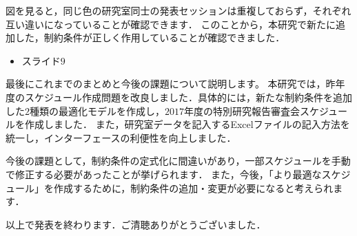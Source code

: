 \documentclass[a4j]{jarticle}
\begin{document}
図を見ると，同じ色の研究室同士の発表セッションは重複しておらず，それぞれ互い違いになっていることが確認できます．
このことから，本研究で新たに追加した，制約条件が正しく作用していることが確認できました．



\begin{itemize}
\item スライド$9$
\end{itemize}
最後にこれまでのまとめと今後の課題について説明します。
本研究では，昨年度のスケジュール作成問題を改良しました．具体的には，新たな制約条件を追加した$2$種類の最適化モデルを作成し，$2017$年度の特別研究報告審査会スケジュールを作成しました．
また，研究室データを記入するExcelファイルの記入方法を統一し，インターフェースの利便性を向上しました．

今後の課題として，制約条件の定式化に間違いがあり，一部スケジュールを手動で修正する必要があったことが挙げられます．
また，今後，「より最適なスケジュール」を作成するために，制約条件の追加・変更が必要になると考えられます．

以上で発表を終わります．ご清聴ありがとうございました．
%
\end{document}
